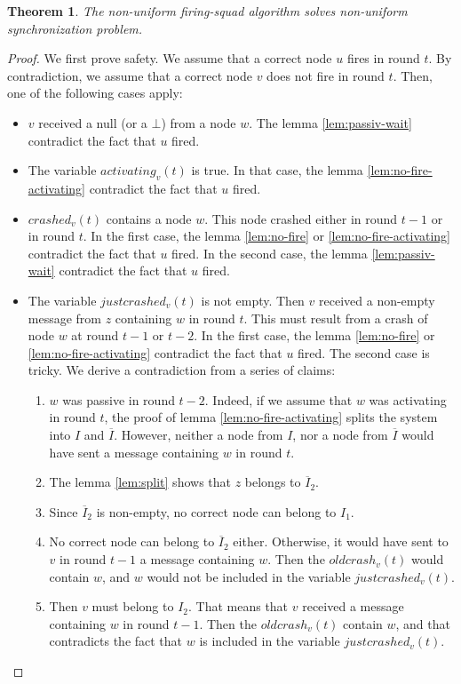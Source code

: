 \documentclass{article}
\newtheorem{theorem}{Theorem}
\begin{document}
\begin{theorem}
	The non-uniform firing-squad algorithm solves non-uniform synchronization problem.
\end{theorem}
\begin{proof}
	We first prove safety. We assume that a correct node $u$ fires in round $t$.
	By contradiction, we assume that a correct node $v$ does not fire in round $t$.
	Then, one of the following cases apply:
	\begin{itemize}
		\item $v$ received a null (or a $\bot$) from a node $w$.
			The lemma \ref{lem:passiv-wait} contradict the fact that $u$ fired.
		\item The variable $activating_v(t)$ is true.
			In that case, the lemma \ref{lem:no-fire-activating} contradict the fact that $u$ fired.
		\item $crashed_v(t)$ contains a node $w$. This node crashed either in round $t-1$ or in round $t$.
			In the first case, the lemma \ref{lem:no-fire} or \ref{lem:no-fire-activating} contradict the fact that $u$ fired.
			In the second case, the lemma \ref{lem:passiv-wait} contradict the fact that $u$ fired.
		\item The variable $justcrashed_v(t)$ is not empty. Then $v$ received a non-empty message from $z$ containing $w$ in round $t$. 
			This must result from a crash of node $w$ at round $t-1$ or $t-2$.
			In the first case, the lemma \ref{lem:no-fire} or \ref{lem:no-fire-activating} contradict the fact that $u$ fired.
			The second case is tricky. We derive a contradiction from a series of claims:
			\begin{enumerate}
				\item $w$ was passive in round $t-2$.
					Indeed, if we assume that $w$ was activating in round $t$, the proof of lemma \ref{lem:no-fire-activating} splits the system into $I$ and $\overline{I}$.
					However, neither a node from $I$, nor a node from $\overline{I}$ would have sent a message containing $w$ in round $t$.
				\item The lemma \ref{lem:split} shows that $z$ belongs to $\overline{I}_2$.
				\item Since $\overline{I}_2$ is non-empty, no correct node can belong to $I_1$.
				\item No correct node can belong to $\overline{I}_2$ either. Otherwise, it would have sent to $v$ in round $t-1$ a message containing $w$.
					Then the $oldcrash_v(t)$ would contain $w$, and $w$ would not be included in the variable $justcrashed_v(t)$.
				\item Then $v$ must belong to $I_2$. That means that $v$ received a message containing $w$ in round $t-1$.
					Then the $oldcrash_v(t)$ contain $w$, and that contradicts the fact that $w$ is included in the variable $justcrashed_v(t)$.
			\end{enumerate}
	\end{itemize}


\end{proof}
\end{document}
